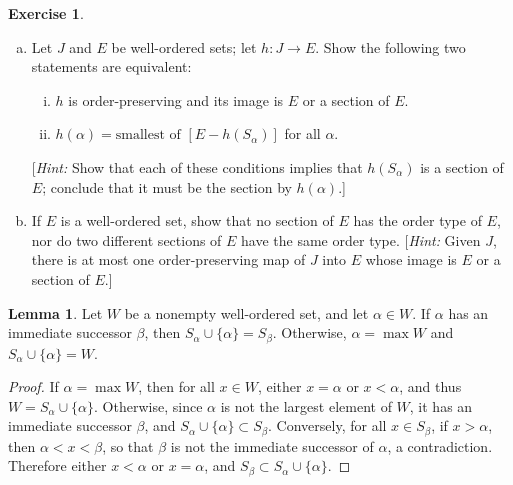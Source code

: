 \documentclass[11pt,a4paper,twoside]{article}
\theoremstyle{definition}
\newcounter{excounter}
\newtheorem{exercise}[excounter]{Exercise}
\newtheorem{lemma}{Lemma}
\begin{document}
\begin{exercise}\hfill

  \begin{enumerate}[(a)]

  \item\label{point:a} Let $J$ and $E$ be well-ordered sets; let $h : J \to E$. Show the following two statements
    are equivalent:
    \begin{enumerate}[(i)]

      \item \label{it:order_preserving} $h$ is order-preserving and its image is $E$ or a section of $E$.

      \item \label{it:smallest} $h ( \alpha ) = \text{smallest of } [ E - h ( S_\alpha ) ]$ for all $\alpha$.

    \end{enumerate}
    [\emph{Hint:} Show that each of these conditions implies that $h ( S_\alpha )$ is a section of $E$;
    conclude that it must be the section by $h ( \alpha )$.]

  \item If $E$ is a well-ordered set, show that no section of $E$ has the order type of $E$, nor
    do two different sections of $E$ have the same order type. [\emph{Hint:} Given $J$, there is
    at most one order-preserving map of $J$ into $E$ whose image is $E$ or a section of $E$.]

  \end{enumerate}

\end{exercise}

\bigskip
\begin{lemma}\label{lemma:section_structure}
  Let $W$ be a nonempty well-ordered set, and let $\alpha \in W$. If $\alpha$ has an immediate successor
  $\beta$, then $S_\alpha \cup \{ \alpha \} = S_\beta$. Otherwise, $\alpha = \max W$ and $S_\alpha \cup \{ \alpha \} = W$.
\end{lemma}

\begin{proof}
  If $\alpha = \max W$, then for all $x \in W$, either $x = \alpha$ or $x < \alpha$, and thus $W = S_\alpha \cup \{ \alpha \}$.
  Otherwise, since $\alpha$ is not the largest element of $W$, it has an immediate successor $\beta$, and
  $S_\alpha \cup \{ \alpha \} \subset S_\beta$. Conversely, for all $x \in S_\beta$, if $x > \alpha$, then
  $\alpha < x < \beta$, so that $\beta$ is not the immediate successor of $\alpha$, a contradiction. Therefore
  either $x < \alpha$ or $x = \alpha$, and $S_\beta \subset S_\alpha \cup \{ \alpha \}$.
\end{proof}
\end{document}
